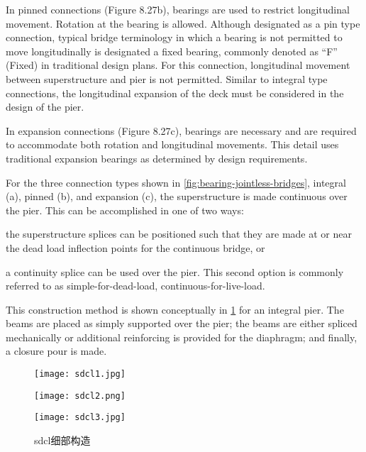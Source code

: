 In pinned connections (Figure 8.27b), bearings are used to restrict longitudinal movement. Rotation at the bearing
is allowed. Although designated as a pin type connection, typical bridge terminology in which a bearing is not
permitted to move longitudinally is designated a fixed bearing, commonly denoted as “F” (Fixed) in traditional design
plans. For this connection, longitudinal movement between superstructure and pier is not permitted. Similar to
integral type connections, the longitudinal expansion of the deck must be considered in the design of the pier.

In expansion connections (Figure 8.27c), bearings are necessary and are required to accommodate both rotation
and longitudinal movements. This detail uses traditional expansion bearings as determined by design requirements.

For the three connection types shown in \cref{fig:bearing-jointless-bridges}, integral (a), pinned (b), and expansion (c), the superstructure
is made continuous over the pier. This can be accomplished in one of two ways: 
\begin{enumerate*}
  \item the superstructure splices can be positioned such that they are made at or near the dead load inflection points for the continuous bridge, or 
  \item a continuity splice can be used over the pier. This second option is commonly referred to as simple-for-dead-load, continuous-for-live-load. 
\end{enumerate*}
This construction method is shown conceptually in \cref{fig:sdcl-details} for an integral pier. The beams are placed as simply supported over the pier; the beams are either spliced mechanically or additional reinforcing is provided for the diaphragm; and finally, a closure pour is made.

\begin{figure}
  \begin{minipage}{0.32\linewidth}\centering
    \texttt{[image: sdcl1.jpg]}
  \end{minipage}%
  \begin{minipage}{0.33\linewidth}\centering
    \texttt{[image: sdcl2.png]}
  \end{minipage}%
  \begin{minipage}{0.35\linewidth}\centering
    \texttt{[image: sdcl3.jpg]}
  \end{minipage}
  \caption{\acrlong*{sdcl}细部构造}
  \label{fig:sdcl-details}
\end{figure}

